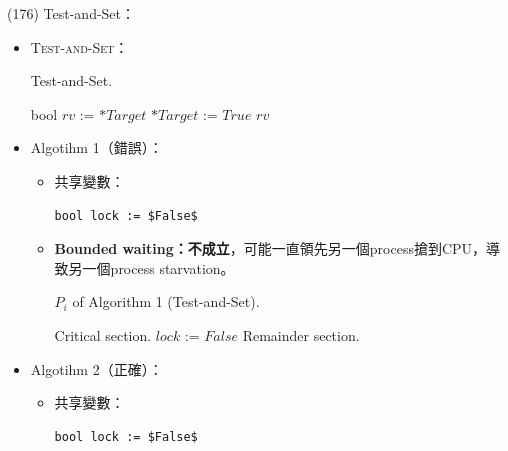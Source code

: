 \begin{theorem}{(176)} Test-and-Set：\begin{itemize}
        \item \textsc{Test-and-Set}：
        \begin{algorithm}[H]
            \caption{Test-and-Set.}
            \begin{algorithmic}[1]
                 
                \State bool $rv$ := $*Target$
                \State $*Target$ := $True$
                \State \Return $rv$
                \EndFunction
            \end{algorithmic}
        \end{algorithm}
        \item Algotihm 1（錯誤）：\begin{itemize}
            \item 共享變數：\begin{lstlisting}[caption={Shared variables of Algorithm 1 (\textsc{Test-and-Set}).}, captionpos=b, mathescape=true]
                bool lock := $False$ 
            \end{lstlisting}
            \item \textbf{Bounded waiting：不成立}，可能一直領先另一個process搶到CPU，導致另一個process starvation。
            \begin{algorithm}[H]
                \caption{$P_i$ of Algorithm 1 (Test-and-Set).}
                \label{algo:test-and-set-algo-1}
                \begin{algorithmic}[1]
                    \Repeat
                        \EndWhile
                        \State Critical section.
                        \State $lock$ := $False$
                        \State Remainder section.
                    \EndFunction
                \end{algorithmic}
            \end{algorithm}
        \end{itemize}
        \item Algotihm 2（正確）：\begin{itemize}
            \item 共享變數：\begin{lstlisting}[caption={Shared variables of Algorithm 2 (\textsc{Test-and-Set}).}, captionpos=b, mathescape=true]
                bool lock := $False$ 

\end{lstlisting}
\end{itemize}
\end{itemize}
\end{theorem}
